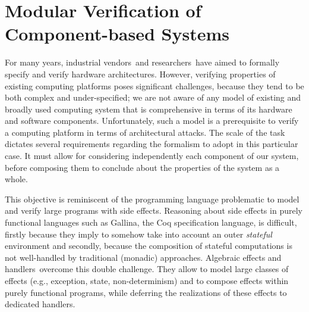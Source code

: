 \chapter{Modular Verification of Component-based Systems}
\label{chapter:freespec}


\vspace{1cm}%
\noindent
%
For many years, industrial vendors\,\cite{reid2017arm,leslie2015sgx}  and
researchers\,\cite{chong2016report,choi2017kami} have aimed to formally specify
and verify hardware architectures.
%
However, verifying properties of existing computing platforms poses significant
challenges, because they tend to be both complex and under-specified; we are not
aware of any model of existing and broadly used computing system that is
comprehensive in terms of its hardware and software components.
%
Unfortunately, such a model is a prerequisite to verify a computing platform in
terms of architectural attacks.
%
The scale of the task dictates several requirements regarding the formalism to
adopt in this particular case.
%
It must allow for considering independently each component of our system, before
composing them to conclude about the properties of the system as a whole. 

This objective is reminiscent of the programming language problematic to model
and verify large programs with side effects.
%
Reasoning about side effects in purely functional languages such as {\textsc
  Gallina}, the Coq specification language, is difficult, firstly because they
imply to somehow take into account an outer \emph{stateful} environment and
secondly, because the composition of stateful computations is not well-handled
by traditional (monadic) approaches.
%
Algebraic effects and handlers\,\cite{bauer2015effects} overcome this double
challenge.
%
They allow to model large classes of effects (e.g., exception, state,
non-determinism) and to compose effects within purely functional programs, while
deferring the realizations of these effects to dedicated handlers.

